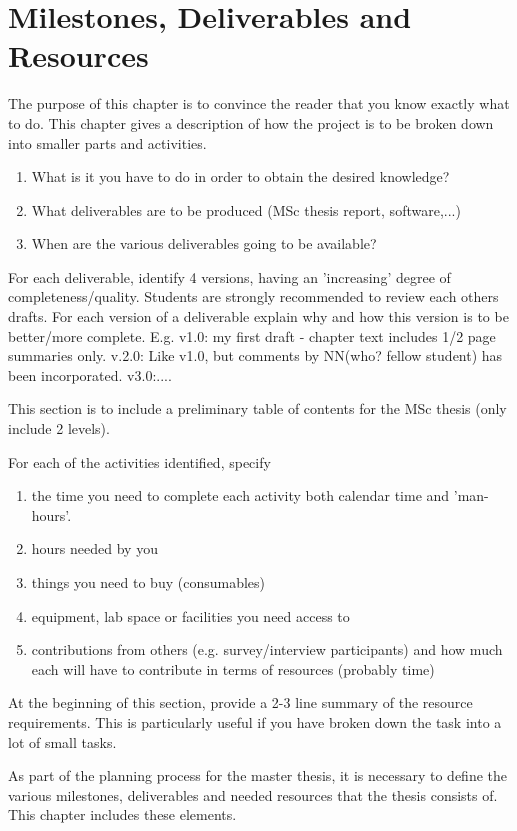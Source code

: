 \chapter{Milestones, Deliverables and Resources}
The purpose of this chapter is to convince the reader that you know exactly what to do.
This chapter gives a description of how the project is to be
broken down into smaller parts and activities.
\begin{enumerate}
\item  What is it you have to do in order to obtain the desired knowledge?
\item  What deliverables are to be produced (MSc thesis report, software,...)
\item  When are the various deliverables going to be available?
\end{enumerate}

For each deliverable, identify 4 versions, having an
'increasing' degree of completeness/quality.
Students are strongly recommended to review each others drafts.
For each version of a deliverable explain why and how this version is to
be better/more complete.  E.g. v1.0: my first draft -
chapter text includes 1/2 page summaries only.
v.2.0: Like v1.0, but comments by NN(who? fellow student)
has been incorporated. v3.0:....

This section is to include a preliminary table of contents for the MSc thesis
(only include 2 levels).

For each of the activities identified, specify
\begin{enumerate}
\item  the time you need to complete each activity both calendar time and 'man-hours'.
\item  hours needed by you
\item  things you need to buy (consumables)
\item  equipment, lab space or facilities you need access to
\item  contributions from others (e.g. survey/interview participants) and how much each will have to contribute in terms of resources (probably time)
\end{enumerate}
At the beginning of this section, provide a 2-3 line summary of the
resource requirements.  This is particularly useful if you have broken
down the task into a lot of small tasks.
\fi

As part of the planning process for the master thesis, it is necessary to define the various milestones, deliverables and needed resources that the thesis consists of. This chapter includes these elements. 

